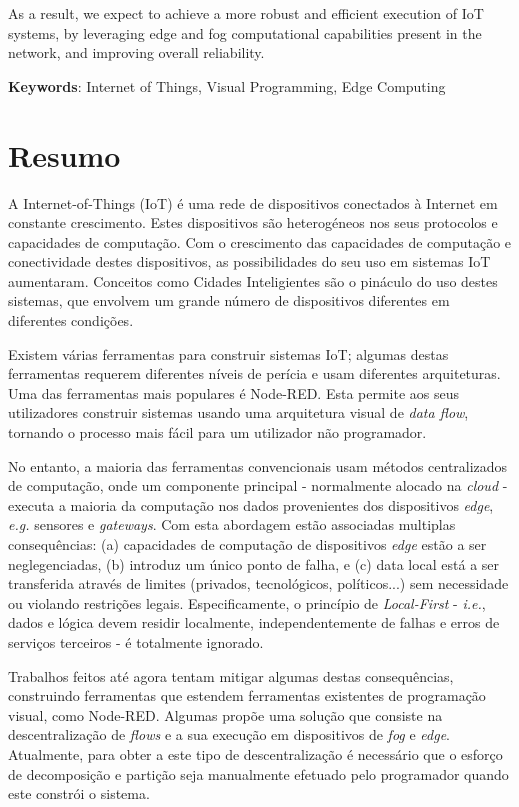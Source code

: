 As a result, we expect to achieve a more robust and efficient execution of IoT systems, by leveraging edge and fog computational capabilities present in the network, and improving overall reliability. 


\vspace*{10mm}\noindent
\textbf{Keywords}: Internet of Things, Visual Programming, Edge Computing

\chapter*{Resumo}

A Internet-of-Things (IoT) é uma rede de dispositivos conectados à Internet em constante crescimento. Estes dispositivos são heterogéneos nos seus protocolos e capacidades de computação. Com o crescimento das capacidades de computação e conectividade destes dispositivos, as possibilidades do seu uso em sistemas IoT aumentaram. Conceitos como Cidades Inteligientes são o pináculo do uso destes sistemas, que envolvem um grande número de dispositivos diferentes em diferentes condições.
\par Existem várias ferramentas para construir sistemas IoT; algumas destas ferramentas requerem diferentes níveis de perícia e usam diferentes arquiteturas. Uma das ferramentas mais populares é Node-RED. Esta permite aos seus utilizadores construir sistemas usando uma arquitetura visual de \emph{data flow}, tornando o processo mais fácil para um utilizador não programador.
\par No entanto, a maioria das ferramentas convencionais usam métodos centralizados de computação, onde um componente principal - normalmente alocado na \emph{cloud} - executa a maioria da computação nos dados provenientes dos dispositivos \emph{edge}, \emph{e.g.} sensores e \emph{gateways}. Com esta abordagem estão associadas multiplas consequências: (a) capacidades de computação de dispositivos \emph{edge} estão a ser neglegenciadas, (b) introduz um único ponto de falha, e (c) data local está a ser transferida através de limites (privados, tecnológicos, políticos...) sem necessidade ou violando restrições legais. Especificamente, o princípio de \emph{Local-First} - \emph{i.e.}, dados e lógica devem residir localmente, independentemente de falhas e erros de serviços terceiros - é totalmente ignorado.
\par Trabalhos feitos até agora tentam mitigar algumas destas consequências, construindo ferramentas que estendem ferramentas existentes de programação visual, como Node-RED. Algumas propõe uma solução que consiste na descentralização de \emph{flows} e a sua execução em dispositivos de \emph{fog} e \emph{edge}. Atualmente, para obter a este tipo de descentralização é necessário que o esforço de decomposição e partição seja manualmente efetuado pelo programador quando este constrói o sistema.
